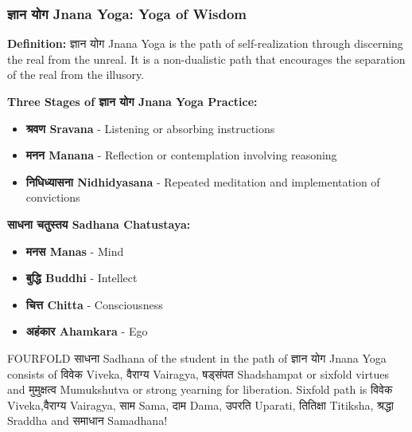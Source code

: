 
\begin{frame}[fragile]\frametitle{ज्ञान योग  Jnana Yoga: Yoga of Wisdom}
    \textbf{Definition:} ज्ञान योग  Jnana Yoga is the path of self-realization through discerning the real from the unreal. It is a non-dualistic path that encourages the separation of the real from the illusory.

    
    \textbf{Three Stages of ज्ञान योग  Jnana Yoga Practice:}
    \begin{itemize}
        \item \textbf{श्रवण Sravana} - Listening or absorbing instructions
        \item \textbf{मनन Manana} - Reflection or contemplation involving reasoning
        \item \textbf{निधिध्यासना  Nidhidyasana} - Repeated meditation and implementation of convictions
    \end{itemize}

    \textbf{साधना चतुस्तय Sadhana Chatustaya:}
    \begin{itemize}
        \item \textbf{मनस Manas} - Mind
        \item \textbf{बुद्धि Buddhi} - Intellect
        \item \textbf{चित्त Chitta} - Consciousness
        \item \textbf{अहंकार Ahamkara} - Ego
    \end{itemize}
	
FOURFOLD साधना Sadhana of the student in the path of ज्ञान योग   Jnana Yoga consists of विवेक  Viveka, वैराग्य  Vairagya, षड्संपत  Shadshampat or sixfold virtues and मुमुक्षत्व   Mumukshutva or strong yearning for liberation. Sixfold path is विवेक  Viveka,वैराग्य  Vairagya, साम  Sama, दाम  Dama, उपरति  Uparati, तितिक्षा Titiksha, श्रद्धा Sraddha and समाधान Samadhana!
	
\end{frame}


